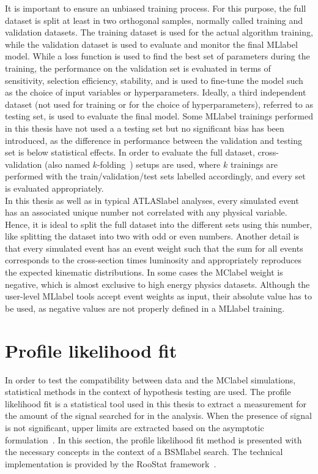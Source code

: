 It is important to ensure an unbiased training process. For this purpose, the full dataset is split at least in two orthogonal samples, normally called training and validation datasets. The training dataset is used for the actual algorithm training, while the validation dataset is used to evaluate and monitor the final \acrshort{MLlabel} model. While a loss function is used to find the best set of parameters during the training, the performance on the validation set is evaluated in terms of sensitivity, selection efficiency, stability, and is used to fine-tune the model such as the choice of input variables or hyperparameters. Ideally, a third independent dataset (not used for training or for the choice of hyperparameters), referred to as testing set, is used to evaluate the final model. Some \acrshort{MLlabel} trainings performed in this thesis have not used a a testing set but no significant bias has been introduced, as the difference in performance between the validation and testing set is below statistical effects. In order to evaluate the full dataset, cross-validation (also named $k$-folding~\cite{EncyclopediaofML}) setups are used, where $k$ trainings are performed with the train/validation/test sets labelled accordingly, and every set is evaluated appropriately.\\

In this thesis as well as in typical \acrshort{ATLASlabel} analyses, every simulated event has an associated unique number not correlated with any physical variable. Hence, it is ideal to split the full dataset into the different sets using this number, like splitting the dataset into two with odd or even numbers. Another detail is that every simulated event has an event weight such that the sum for all events corresponds to the cross-section times luminosity and appropriately reproduces the expected kinematic distributions. In some cases the \acrshort{MClabel} weight is negative, which is almost exclusive to high energy physics datasets. Although the user-level \acrshort{MLlabel} tools accept event weights as input, their absolute value has to be used, as negative values are not properly defined in a \acrshort{MLlabel} training.

\section{Profile likelihood fit}
\label{sec:profilelikelihoodfit}

In order to test the compatibility between data and the \acrshort{MClabel} simulations, statistical methods in the context of hypothesis testing are used. The profile likelihood fit is a statistical tool used in this thesis to extract a measurement for the amount of the signal searched for in the analysis. When the presence of signal is not significant, upper limits are extracted based on the asymptotic formulation~\cite{Cowan_2011}. In this section, the profile likelihood fit method is presented with the necessary concepts in the context of a \acrshort{BSMlabel} search.
The technical implementation is provided by the RooStat framework~\cite{10.48550/arxiv.1009.1003}.\\

